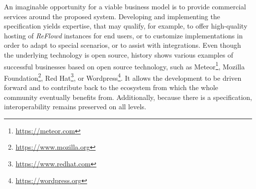 \documentclass[12pt,english,a4paper,titlepage,cleardoublepage=empty,dottedtoc]{report}
\renewcommand{\href}[2]{#2\footnote{\url{#1}}}
\begin{document}
An imaginable opportunity for a viable business model is to provide
commercial services around the proposed system. Developing and
implementing the specification yields expertise, that may qualify, for
example, to offer high-quality hosting of \emph{ReFlowd} instances for
end users, or to customize implementations in order to adapt to special
scenarios, or to assist with integrations. Even though the underlying
technology is open source, history shows various examples of successful
businesses based on open source technology, such as
\href{https://meteor.com}{Meteor},
\href{https://www.mozilla.org}{Mozilla Foundation},
\href{https://www.redhat.com}{Red Hat}, or
\href{https://wordpress.org}{Wordpress}. It allows the development to be
driven forward and to contribute back to the ecosystem from which the
whole community eventually benefits from. Additionally, because there is
a specification, interoperability remains preserved on all levels.
\end{document}
